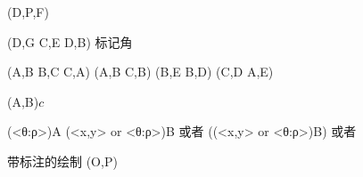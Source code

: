 \documentclass[11pt]{article}
\begin{document}
\tkzMarkRightAngle[blue](D,P,F)


\tkzMarkSegments[blue](D,G C,E D,B)
标记角

\tkzMarkSegments[mark=s||](A,B B,C C,A)
\tkzMarkSegments[color=red,mark=|](A,B C,B)
\tkzMarkSegments[color=blue,mark=||](B,E B,D)
\tkzMarkSegments[color=brown,mark=|||](C,D A,E)


\tkzLabelSegments[swap](A,B){$c$}

\tkzDefPoint(<θ:ρ>){A}
\tkzDefShiftPoint[A](<x,y> or <θ:ρ>){B} 或者 
\tkzDefPoint[shift={(<x,y> or <θ:ρ>)}]((<x,y> or <θ:ρ>){B}) 或者 
\tkzDefPointOnCircle[angle=θ,center=A,radius=ρ] 

带标注的绘制
\tkzDrawSegment[dim={$d$,16pt,above=6pt}](O,P)
\fi		
\end{document}
